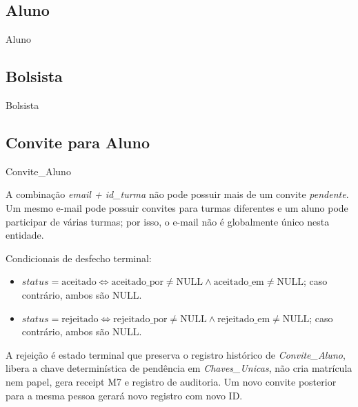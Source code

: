 \subsection{Aluno}
\begin{entidade}{Aluno}
\end{entidade}

\subsection{Bolsista}
\begin{entidade}{Bolsista}
\end{entidade}

\subsection{Convite para Aluno}
\begin{entidade}{Convite\_Aluno}
\end{entidade}

\begin{regra}
A combinação \textit{email + id\_turma} não pode possuir mais de um convite \textit{pendente}. Um mesmo e-mail pode possuir convites para turmas diferentes e um aluno pode participar de várias turmas; por isso, o e-mail não é globalmente único nesta entidade.

Condicionais de desfecho terminal:
\begin{itemize}
    \item $status = \text{aceitado} \iff \text{aceitado\_por} \neq \text{NULL} \land \text{aceitado\_em} \neq \text{NULL}$; caso contrário, ambos são NULL.
    \item $status = \text{rejeitado} \iff \text{rejeitado\_por} \neq \text{NULL} \land \text{rejeitado\_em} \neq \text{NULL}$; caso contrário, ambos são NULL.
\end{itemize}
A rejeição é estado terminal que preserva o registro histórico de \textit{Convite\_Aluno}, libera a chave determinística de pendência em \textit{Chaves\_Unicas}, não cria matrícula nem papel, gera receipt M7 e registro de auditoria. Um novo convite posterior para a mesma pessoa gerará novo registro com novo ID.
\end{regra}

